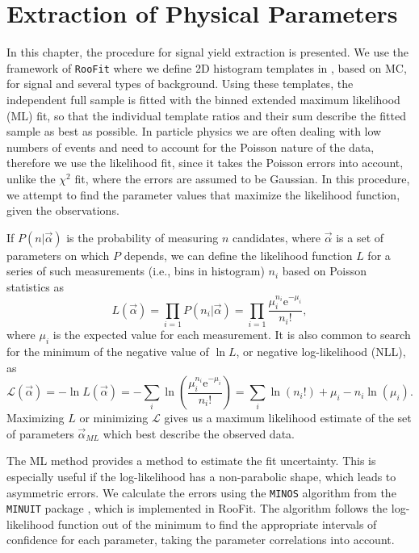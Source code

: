\chapter{Extraction of Physical Parameters}
\label{sec:extraction-of-physical-parameters}
In this chapter, the procedure for signal yield extraction is presented. We use the framework of \texttt{RooFit} \cite{verkerke2006roofit} where we define 2D histogram templates in \vars, based on MC, for signal and several types of background. Using these templates, the independent full sample is fitted with the binned extended maximum likelihood (ML) fit, so that the individual template ratios and their sum describe the fitted sample as best as possible. In particle physics we are often dealing with low numbers of events and need to account for the Poisson nature of the data, therefore we use the likelihood fit, since it takes the Poisson errors into account, unlike the $\chi^2$ fit, where the errors are assumed to be Gaussian. In this procedure, we attempt to find the parameter values that maximize the likelihood function, given the observations.

If $P(n\vert\vec \alpha)$ is the probability of measuring $n$ candidates, where $\vec \alpha$ is a set of parameters on which $P$ depends, we can define the likelihood function $L$ for a series of such measurements (i.e., bins in histogram) $n_i$ based on Poisson statistics as
\begin{equation}
\label{eq:ML}
L(\vec \alpha) = \prod_{i=1} P(n_i|\vec \alpha) = \prod_{i=1} \frac{\mu_i^{n_i}\mathrm{e}^{-\mu_i}}{n_i!},
\end{equation}
where $\mu_i$ is the expected value for each measurement. It is also common to search for the minimum of the negative value of $\ln L$, or negative log-likelihood (NLL), as
\begin{equation}
\label{eq:NLL}
\mathcal{L}(\vec \alpha) = -\ln L(\vec \alpha) = -\sum_{i}\ln \left(\frac{\mu_i^{n_i}\mathrm{e}^{-\mu_i}}{n_i!}\right) = \sum_{i}\ln(n_i!) + \mu_i - n_i\ln(\mu_i).
\end{equation}
Maximizing $L$ or minimizing $\mathcal{L}$ gives us a maximum likelihood estimate of the set of parameters $\vec \alpha_{ML}$ which best describe the observed data. 

The ML method provides a method to estimate the fit uncertainty. This is especially useful if the log-likelihood has a non-parabolic shape, which leads to asymmetric errors. We calculate the errors using the \texttt{MINOS} algorithm from the \texttt{MINUIT} package \cite{James:1994vla}, which is implemented in RooFit. The algorithm follows the log-likelihood function out of the minimum to find the appropriate intervals of confidence for each parameter, taking the parameter correlations into account. 

